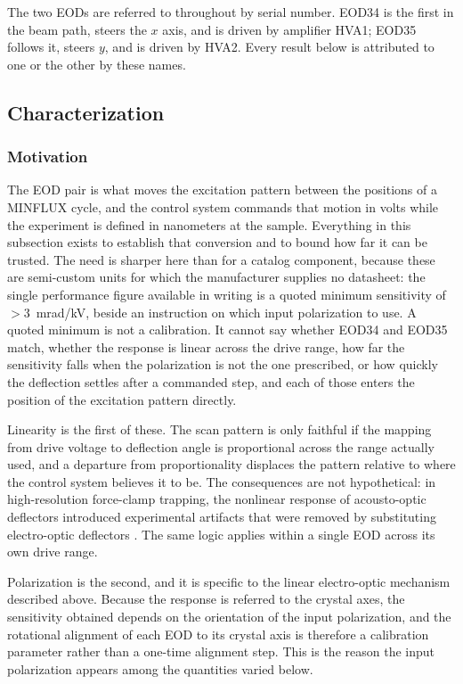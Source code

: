 \documentclass{article}
\begin{document}
The two EODs are referred to throughout by serial number. EOD34 is the first in the beam
path, steers the $x$ axis, and is driven by amplifier HVA1; EOD35 follows it, steers $y$, and is
driven by HVA2. Every result below is attributed to one or the other by these names.

\subsection{Characterization}

\subsubsection{Motivation}

The EOD pair is what moves the excitation pattern between the positions of a MINFLUX cycle, and the
control system commands that motion in volts while the experiment is defined in nanometers at the
sample. Everything in this subsection exists to establish that conversion and to bound how far it
can be trusted. The need is sharper here than for a catalog component, because these are
semi-custom units for which the manufacturer supplies no datasheet: the single performance figure
available in writing is a quoted minimum sensitivity of ${>}3$~mrad/kV, beside an instruction on
which input polarization to use. A quoted minimum is not a
calibration. It cannot say whether EOD34 and EOD35 match, whether the response is linear across the
drive range, how far the sensitivity falls when the polarization is not the one prescribed, or how quickly the deflection
settles after a commanded step, and each of those enters the position of the excitation pattern
directly.

Linearity is the first of these. The scan pattern is only faithful if the mapping from drive voltage
to deflection angle is proportional across the range actually used, and a departure from
proportionality displaces the pattern relative to where the control system believes it to be. The
consequences are not hypothetical: in high-resolution force-clamp trapping, the nonlinear response
of acousto-optic deflectors introduced experimental artifacts that were removed by substituting
electro-optic deflectors \cite{woodyElectroopticDeflectorsDeliver2018}. The same logic applies
within a single EOD across its own drive range.

Polarization is the second, and it is specific to the linear electro-optic mechanism described
above. Because the response is referred to the crystal axes, the sensitivity obtained depends on the
orientation of the input polarization, and the rotational alignment of each EOD to its crystal
axis is therefore a calibration parameter rather than a one-time alignment step. This is the reason
the input polarization appears among the quantities varied below.
\end{document}
